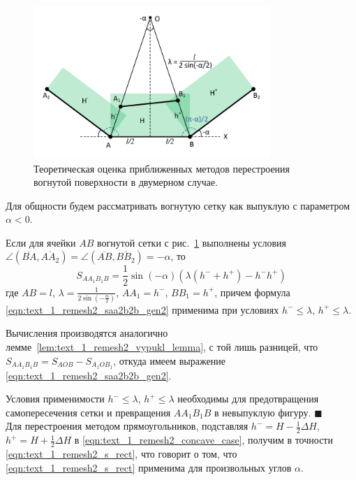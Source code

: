\begin{figure}[ht]
\centering
\includegraphics[width=0.8\textwidth]{pics/text_1_remesh_2d/theoretical_concave.pdf}
\singlespacing
{}\caption{Теоретическая оценка приближенных методов перестроения вогнутой поверхности в двумерном случае.}
\label{fig:text_1_remesh_2d_theoretical_concave}
\end{figure}

Для общности будем рассматривать вогнутую сетку как выпуклую с параметром $\alpha < 0$.

\begin{lemma}
Если для ячейки $AB$ вогнутой сетки с рис.~\ref{fig:text_1_remesh_2d_theoretical_concave} выполнены условия $\angle (\overline{BA}, \overline{AA_2}) = \angle (\overline{AB}, \overline{BB_2}) = -\alpha$, то
\begin{equation}\label{eqn:text_1_remesh2_saa2b2b_gen2}
S_{AA_1B_1B} = \frac{1}{2} \sin (-\alpha) \left( \lambda(h^{-} + h^{+}) - h^{-}h^{+} \right)
\end{equation}
где $AB = l$, $\lambda = \frac{1}{2 \sin \left( -\frac{\alpha}{2} \right)}$, $AA_1 = h^{-}$, $BB_1 = h^{+}$, причем формула \eqref{eqn:text_1_remesh2_saa2b2b_gen2} применима при условиях $h^{-} \le \lambda$, $h^{+} \le \lambda$.
\end{lemma}

Вычисления производятся аналогично лемме~\ref{lem:text_1_remesh2_vypukl_lemma}, с той лишь разницей, что $S_{AA_1B_1B} = S_{AOB} - S_{A_1OB_1}$, откуда имеем выражение \eqref{eqn:text_1_remesh2_saa2b2b_gen2}.

Условия применимости $h^{-} \le \lambda$, $h^{+} \le \lambda$ необходимы для предотвращения самопересечения сетки и превращения $AA_1B_1B$ в невыпуклую фигуру.
$\blacksquare$\\

Для перестроения методом прямоугольников, подставляя $h^{-} = H - \frac{1}{2} \Delta H$, $h^{+} = H + \frac{1}{2} \Delta H$ в \eqref{eqn:text_1_remesh2_concave_case}, получим в точности \eqref{eqn:text_1_remesh2_s_rect}, что говорит о том, что \eqref{eqn:text_1_remesh2_s_rect} применима для произвольных углов $\alpha$.

